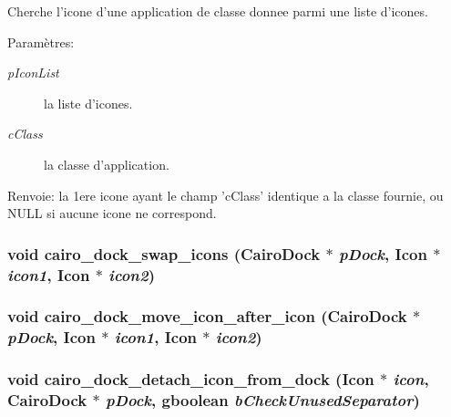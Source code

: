 Cherche l'icone d'une application de classe donnee parmi une liste d'icones. \begin{Desc}
\item[Paramètres:]
\begin{description}
\item[{\em pIconList}]la liste d'icones. \item[{\em cClass}]la classe d'application. \end{description}
\end{Desc}
\begin{Desc}
\item[Renvoie:]la 1ere icone ayant le champ 'cClass' identique a la classe fournie, ou NULL si aucune icone ne correspond. \end{Desc}
\subsubsection{\setlength{\rightskip}{0pt plus 5cm}void cairo\_\-dock\_\-swap\_\-icons ({\bf CairoDock} $\ast$ {\em pDock}, {\bf Icon} $\ast$ {\em icon1}, {\bf Icon} $\ast$ {\em icon2})}\label{cairo-dock-icons_8h_c02977792baa2a21b716d1787ddb3d66}


\subsubsection{\setlength{\rightskip}{0pt plus 5cm}void cairo\_\-dock\_\-move\_\-icon\_\-after\_\-icon ({\bf CairoDock} $\ast$ {\em pDock}, {\bf Icon} $\ast$ {\em icon1}, {\bf Icon} $\ast$ {\em icon2})}\label{cairo-dock-icons_8h_b74f1ffc9f9fa74089e88fc6650632db}


\subsubsection{\setlength{\rightskip}{0pt plus 5cm}void cairo\_\-dock\_\-detach\_\-icon\_\-from\_\-dock ({\bf Icon} $\ast$ {\em icon}, {\bf CairoDock} $\ast$ {\em pDock}, gboolean {\em bCheckUnusedSeparator})}\label{cairo-dock-icons_8h_d935bcfab81e0f2435e6eb59e870801c}


